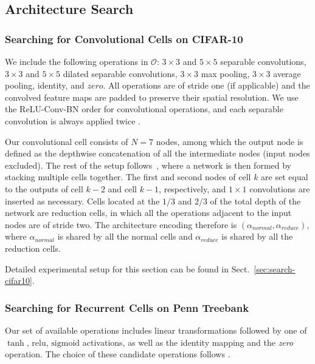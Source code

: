 \documentclass{article}
\begin{document}
\subsection{Architecture Search}
\label{sec:sec:experiment-search}
\subsubsection{Searching for Convolutional Cells on CIFAR-10}
We include the following operations in $\mathcal{O}$: $3\times3$ and $5\times5$ separable convolutions,
$3\times3$ and $5\times5$ dilated separable convolutions,
$3\times3$ max pooling,
$3\times3$ average pooling,
identity,
and $zero$.
All operations are of stride one (if applicable) and the convolved feature maps are padded to preserve their spatial resolution.
We use the ReLU-Conv-BN order for convolutional operations,
and each separable convolution is always applied twice \citep{zoph2017learning, real2018regularized, liu2017progressive}.

Our convolutional cell consists of $N=7$ nodes,
among which the output node is defined as the depthwise concatenation of all the intermediate nodes (input nodes excluded).
The rest of the setup follows~\cite{zoph2017learning, liu2017progressive, real2018regularized},
where a network is then formed by stacking multiple cells together.
The first and second nodes of cell $k$
are set equal to the outputs of cell $k-2$ and cell $k-1$, respectively,
and $1 \times 1$ convolutions are inserted as necessary.
Cells located at the $1/3$ and $2/3$ of the total depth of the network are reduction cells,
in which all the operations adjacent to the input nodes are of stride two.
The architecture encoding therefore is $(\alpha_{normal}, \alpha_{reduce})$,
where $\alpha_{normal}$ is shared by all the normal cells and $\alpha_{reduce}$ is shared by all the reduction cells.

Detailed experimental setup for this section can be found in Sect.~\ref{sec:search-cifar10}.

\subsubsection{Searching for Recurrent Cells on Penn Treebank}
Our set of available operations includes linear transformations followed by one of $\tanh$, $\mathrm{relu}$,
 $\mathrm{sigmoid}$ activations, as well as the identity mapping and the \emph{zero} operation.
 The choice of these candidate operations follows \cite{zoph2016neural, pham2018efficient}.
 
\end{document}
